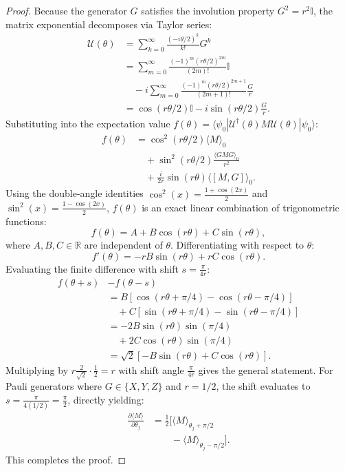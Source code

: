 \documentclass[journal]{IEEEtran}
\begin{document}
\begin{proof}
Because the generator $G$ satisfies the involution property $G^2 = r^2 \mathbb{I}$, the matrix exponential decomposes via Taylor series:
\begin{align}
\mathcal{U}(\theta) &= \sum_{k=0}^{\infty} \frac{(-i \theta / 2)^k}{k!} G^k \nonumber \\
&= \sum_{m=0}^{\infty} \frac{(-1)^m (r\theta/2)^{2m}}{(2m)!} \mathbb{I} \nonumber \\
&\quad - i \sum_{m=0}^{\infty} \frac{(-1)^m (r\theta/2)^{2m+1}}{(2m+1)!} \frac{G}{r} \nonumber \\
&= \cos(r\theta/2) \mathbb{I} - i \sin(r\theta/2) \frac{G}{r}.
\end{align}
Substituting into the expectation value $f(\theta) = \langle \psi_0 | \mathcal{U}^\dagger(\theta) M \mathcal{U}(\theta) | \psi_0 \rangle$:
\begin{align}
f(\theta) &= \cos^2(r\theta / 2) \langle M \rangle_0 \nonumber \\
&\quad + \sin^2(r\theta / 2) \frac{\langle G M G \rangle_0}{r^2} \nonumber \\
&\quad + \frac{i}{2r} \sin(r\theta) \langle [M, G] \rangle_0.
\end{align}
Using the double-angle identities $\cos^2(x) = \frac{1+\cos(2x)}{2}$ and $\sin^2(x) = \frac{1-\cos(2x)}{2}$, $f(\theta)$ is an exact linear combination of trigonometric functions:
\begin{equation}
f(\theta) = A + B \cos(r\theta) + C \sin(r\theta),
\end{equation}
where $A, B, C \in \mathbb{R}$ are independent of $\theta$. Differentiating with respect to $\theta$:
\begin{equation}
f'(\theta) = -r B \sin(r\theta) + r C \cos(r\theta).
\label{eq:trig_derivative}
\end{equation}
Evaluating the finite difference with shift $s = \frac{\pi}{4r}$:
\begin{align}
f(\theta + s) &- f(\theta - s) \nonumber \\
&= B \left[\cos(r\theta + \pi/4) - \cos(r\theta - \pi/4)\right] \nonumber \\
&\quad + C \left[\sin(r\theta + \pi/4) - \sin(r\theta - \pi/4)\right] \nonumber \\
&= -2 B \sin(r\theta) \sin(\pi/4) \nonumber \\
&\quad + 2 C \cos(r\theta) \sin(\pi/4) \nonumber \\
&= \sqrt{2} [-B \sin(r\theta) + C \cos(r\theta)].
\end{align}
Multiplying by $r \frac{2}{\sqrt{2}} \cdot \frac{1}{2} = r$ with shift angle $\frac{\pi}{4r}$ gives the general statement. For Pauli generators where $G \in \{X, Y, Z\}$ and $r = 1/2$, the shift evaluates to $s = \frac{\pi}{4(1/2)} = \frac{\pi}{2}$, directly yielding:
\begin{align}
\frac{\partial \langle M \rangle}{\partial \theta_j} &= \frac{1}{2} \Big[ \langle M \rangle_{\theta_j + \pi/2} \nonumber \\
&\qquad - \langle M \rangle_{\theta_j - \pi/2} \Big].
\end{align}
This completes the proof.
\end{proof}
\end{document}
